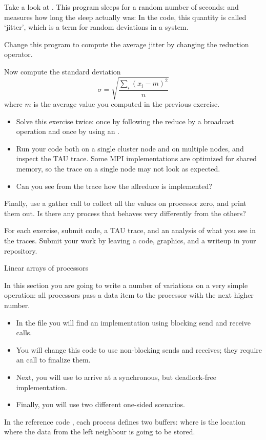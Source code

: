 Take a look at . This program sleeps for a random
number of seconds: 
and measures how long the sleep actually was:
In the code, this quantity is called `jitter', which is a term
for random deviations in a system.

\begin{exercise}
  Change this program to compute the average jitter by changing the reduction
  operator.
\end{exercise}

\begin{exercise}
  Now compute the standard deviation
  \[ \sigma = \sqrt{\frac{ \sum_i (x_i-m)^2 }{n} } \]
  where $m$ is the average value you computed in the previous exercise.
  \begin{itemize}
  \item Solve this exercise twice: once by following the reduce by a
    broadcast operation and once by using an .
  \item Run your code both on a single cluster node and on multiple
    nodes, and inspect the TAU trace. Some MPI implementations are
    optimized for shared memory, so the trace on a single node may not
    look as expected.
  \item Can you see from the trace how the allreduce is implemented?
  \end{itemize}
\end{exercise}

\begin{exercise}
  Finally, use a gather call to collect all the values on processor
  zero, and print them out. Is there any process that behaves very
  differently from the others?
\end{exercise}

\begin{istc}
For each exercise, submit code, a TAU trace, and an analysis of what
you see in the traces. Submit your work by leaving a code, graphics,
and a writeup in your repository.
\end{istc}

 {Linear arrays of processors}

In this section you are going to write a number of variations on
a very simple operation: 
all processors pass a data item to the processor with the next higher
number.
\begin{itemize}
\item In the file  you will find an implementation
  using blocking send and receive calls.
\item You will change this code to use non-blocking sends and
  receives; they require an  call to finalize them.
\item Next, you will use  to arrive at a synchronous,
  but deadlock-free implementation.
\item Finally, you will use two different one-sided scenarios.
\end{itemize}
In the reference code , each process defines two buffers:
where  is the location where the data from the left neighbour is going to be stored.

